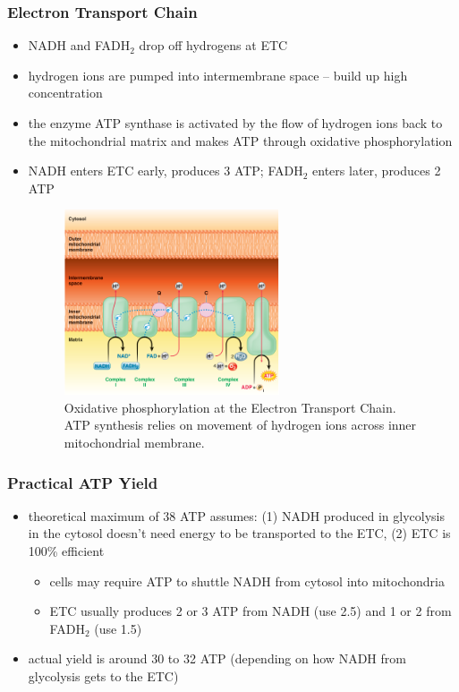 \documentclass[10pt]{article}
\begin{document}
\subsubsection*{Electron Transport Chain}
\begin{itemize}
    \item NADH and FADH$_2$ drop off hydrogens at ETC
    \item hydrogen ions are pumped into intermembrane space -- build up high concentration
    \item the enzyme ATP synthase is activated by the flow of hydrogen ions back to the mitochondrial matrix and makes ATP through oxidative phosphorylation
    \item NADH enters ETC early, produces 3 ATP; FADH$_2$ enters later, produces 2 ATP
        \begin{figure}[h]
            \centering
            \includegraphics[width=0.6\textwidth]{ETC}
            \caption{Oxidative phosphorylation at the Electron Transport Chain. ATP synthesis relies on movement of hydrogen ions across inner mitochondrial membrane.}
            \label{fig:ETC}
        \end{figure}
\end{itemize}

\subsubsection{Practical ATP Yield}
\begin{itemize}
    \item theoretical maximum of 38 ATP assumes: (1) NADH produced in glycolysis in the cytosol doesn't need energy to be transported to the ETC, (2) ETC is 100\% efficient
        \begin{itemize}
            \item cells may require ATP to shuttle NADH from cytosol into mitochondria
            \item ETC usually produces 2 or 3 ATP from NADH (use 2.5) and 1 or 2 from FADH$_2$ (use 1.5)
        \end{itemize}
    \item actual yield is around 30 to 32 ATP (depending on how NADH from glycolysis gets to the ETC)
\end{itemize}
\end{document}
